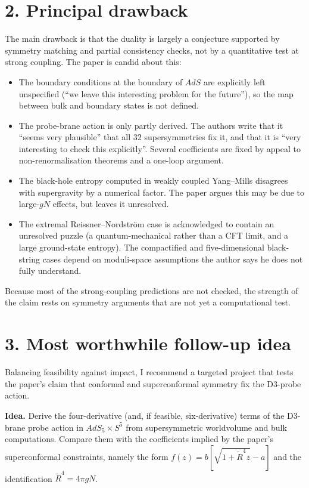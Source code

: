 \documentclass[11pt]{article}
\begin{document}
\section*{2. Principal drawback}

The main drawback is that the duality is largely a conjecture supported by symmetry matching and partial consistency checks, not by a quantitative test at strong coupling. The paper is candid about this:
\begin{itemize}
  \item The boundary conditions at the boundary of $AdS$ are explicitly left unspecified (``we leave this interesting problem for the future''), so the map between bulk and boundary states is not defined.
  \item The probe-brane action is only partly derived. The authors write that it ``seems very plausible'' that all 32 supersymmetries fix it, and that it is ``very interesting to check this explicitly''. Several coefficients are fixed by appeal to non-renormalisation theorems and a one-loop argument.
  \item The black-hole entropy computed in weakly coupled Yang--Mills disagrees with supergravity by a numerical factor. The paper argues this may be due to large-$gN$ effects, but leaves it unresolved.
  \item The extremal Reissner--Nordstr\"om case is acknowledged to contain an unresolved puzzle (a quantum-mechanical rather than a CFT limit, and a large ground-state entropy). The compactified and five-dimensional black-string cases depend on moduli-space assumptions the author says he does not fully understand.
\end{itemize}
Because most of the strong-coupling predictions are not checked, the strength of the claim rests on symmetry arguments that are not yet a computational test.

\section*{3. Most worthwhile follow-up idea}

Balancing feasibility against impact, I recommend a targeted project that tests the paper's claim that conformal and superconformal symmetry fix the D3-probe action.

\textbf{Idea.} Derive the four-derivative (and, if feasible, six-derivative) terms of the D3-brane probe action in $AdS_5\times S^5$ from supersymmetric worldvolume and bulk computations. Compare them with the coefficients implied by the paper's superconformal constraints, namely the form $f(z)=b[\sqrt{1+\tilde R^4 z}-a]$ and the identification $\tilde R^4=4\pi gN$.
\end{document}
